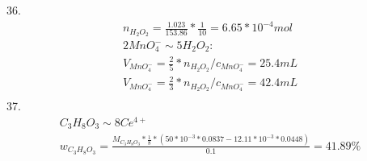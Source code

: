 \documentclass{article}
\begin{document}
36.\begin{equation}
    \begin{multlined}
        n_{H_2O_2} = \frac{1.023}{153.86}*\frac{1}{10} = 6.65*10^{-4}mol\\
        2MnO_4^- \sim 5H_2O_2:\\
        V_{MnO_4^-} = \frac{2}{5}*n_{H_2O_2}/c_{MnO_4^-} = 25.4 mL\\
        V_{MnO_4^-} = \frac{2}{3}*n_{H_2O_2}/c_{MnO_4^-} = 42.4 mL\\
    \end{multlined}
\end{equation}
37.\begin{equation}
    \begin{multlined}
        C_3H_8O_3 \sim 8Ce^{4+}\\
        w_{C_3H_8O_3} = \frac{M_{C_3H_8O_3}*\frac{1}{8}*(50*10^{-3}*0.0837 - 12.11*10^{-3}*0.0448)}{0.1} = 41.89\%\\
    \end{multlined}
\end{equation}
\end{document}
